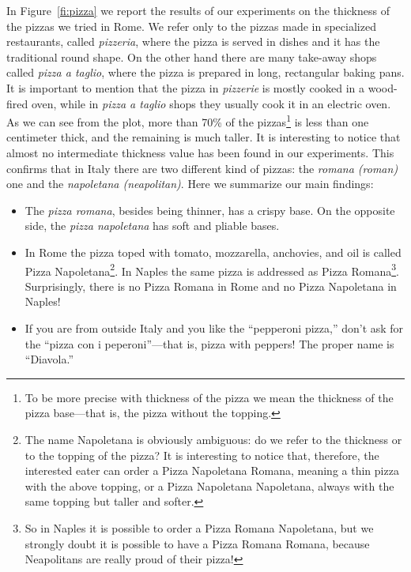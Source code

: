 \documentclass[twocolumn,10pt]{article}
\begin{document}
In Figure~\ref{fi:pizza} we report the results of our experiments on the
thickness of the pizzas we tried in Rome. We refer only to the pizzas
made in specialized restaurants, called \emph{pizzeria}, where the pizza
is served in dishes and it has the traditional round shape. On the other
hand there are many take-away shops called \emph{pizza a taglio}, where
the pizza is prepared in long, rectangular baking pans. It is important
to mention that the pizza in \emph{pizzerie} is mostly cooked in a
wood-fired oven, while in \emph{pizza a taglio} shops they usually cook
it in an electric oven.  As we can see from the plot, more than 70\% of
the pizzas\footnote{To be more precise with thickness of the pizza we
mean the thickness of the pizza base---that is, the pizza without the topping. } is less than one centimeter thick, and the remaining is much taller. It is interesting to notice that almost no intermediate thickness value has been found in our experiments. This confirms that in Italy there are two different kind of pizzas:
the \emph{romana (roman)} one and the \emph{napoletana (neapolitan)}. Here we summarize our main findings:
\begin{itemize}
\item The \emph{pizza romana}, besides being thinner, has a crispy base. On the opposite side, the \emph{pizza napoletana} has soft and pliable bases.
\item In Rome the pizza toped with tomato, mozzarella, anchovies, and oil is called Pizza Napoletana\footnote{The name Napoletana is obviously ambiguous: do we refer to the thickness or to the topping of the pizza? It is interesting to notice that, therefore, the interested eater can order a Pizza Napoletana Romana, meaning a thin pizza with the above topping, or a Pizza Napoletana Napoletana, always with the same topping but taller and softer.}. In Naples the same pizza is addressed as Pizza Romana\footnote{So in Naples it is possible to order a Pizza Romana Napoletana, but we strongly doubt it is possible to have a Pizza Romana Romana, because Neapolitans are really proud of their pizza!}. Surprisingly, there is no Pizza Romana in Rome and no Pizza Napoletana in Naples!

\item If you are from outside Italy and you like the ``pepperoni
pizza,'' don't ask for the ``pizza con i peperoni''---that is, pizza with
peppers! The proper name is ``Diavola.''
\end{itemize}
\end{document}
